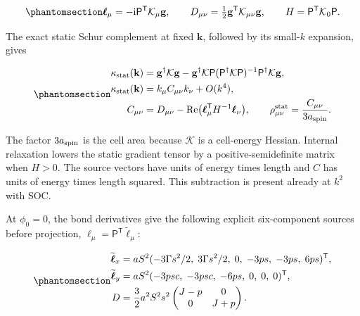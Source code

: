 \begin{equation}\phantomsection\label{eq-nbcp-y-soc-gradient-sources}{
\boldsymbol\ell_\mu=-\mathrm i\mathsf P^{\mathsf T}\mathcal K_\mu\mathbf g,
\qquad
D_{\mu\nu}=\tfrac12\mathbf g^{\mathsf T}\mathcal K_{\mu\nu}\mathbf g,
\qquad H=\mathsf P^{\mathsf T}\mathcal K_0\mathsf P.
}\end{equation}

The exact static Schur complement at fixed \(\mathbf k\), followed by
its small-\(k\) expansion, gives

\begin{equation}\phantomsection\label{eq-nbcp-y-soc-static-schur}{
\begin{aligned}
\kappa_{\rm stat}(\mathbf k)
&=\mathbf g^\dagger\mathcal K\mathbf g
-\mathbf g^\dagger\mathcal K\mathsf P
(\mathsf P^\dagger\mathcal K\mathsf P)^{-1}
\mathsf P^\dagger\mathcal K\mathbf g,\\
\kappa_{\rm stat}(\mathbf k)&=k_\mu C_{\mu\nu}k_\nu+O(k^4),\\
C_{\mu\nu}&=D_{\mu\nu}
-\operatorname{Re}\bigl(\boldsymbol\ell_\mu^{\mathsf T}H^{-1}\boldsymbol\ell_\nu\bigr),
\qquad \rho_{\mu\nu}^{\rm stat}=\frac{C_{\mu\nu}}{3a_{\rm spin}}.
\end{aligned}
}\end{equation}

The factor \(3a_{\rm spin}\) is the cell area because \(\mathcal K\) is
a cell-energy Hessian. Internal relaxation lowers the static gradient
tensor by a positive-semidefinite matrix when \(H>0\). The source
vectors have units of energy times length and \(C\) has units of energy
times length squared. This subtraction is present already at \(k^2\)
with SOC.

At \(\phi_0=0\), the bond derivatives give the following explicit
six-component sources before projection,
\(\boldsymbol\ell_\mu=\mathsf P^{\mathsf T}\widetilde{\boldsymbol\ell}_\mu\):

\begin{equation}\phantomsection\label{eq-nbcp-y-soc-explicit-sources}{
\begin{aligned}
\widetilde{\boldsymbol\ell}_x
&=aS^2(-3\Gamma s^2/2,\;3\Gamma s^2/2,\;0,\;-3ps,\;-3ps,\;6ps)^{\mathsf T},\\
\widetilde{\boldsymbol\ell}_y
&=aS^2(-3psc,\;-3psc,\;-6ps,\;0,\;0,\;0)^{\mathsf T},\\
D&=\frac32a^2S^2s^2
\begin{pmatrix}J-p&0\\0&J+p\end{pmatrix}.
\end{aligned}
}\end{equation}

